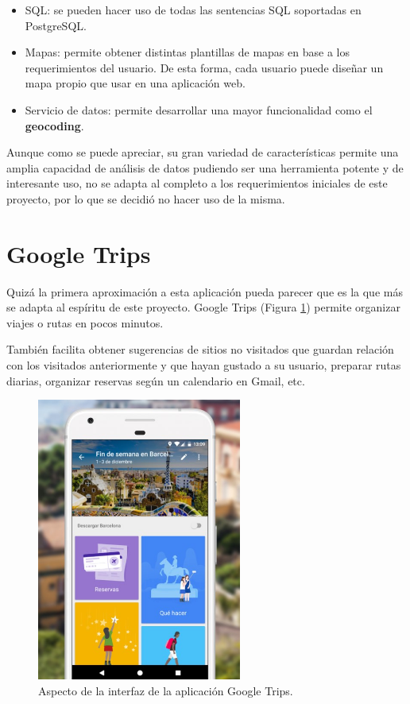 \begin{itemize}
	\item SQL: se pueden hacer uso de todas las sentencias SQL soportadas en PostgreSQL.
	\item Mapas: permite obtener distintas plantillas de mapas en base a los requerimientos del usuario. De esta forma, cada usuario puede diseñar un mapa propio que usar en una aplicación web.
	\item Servicio de datos: permite desarrollar una mayor funcionalidad como el \textbf{geocoding}.
\end{itemize}

Aunque como se puede apreciar, su gran variedad de características permite una amplia capacidad de análisis de datos pudiendo ser una herramienta potente y de interesante uso, no se adapta al completo a los requerimientos iniciales de este proyecto, por lo que se decidió no hacer uso de la misma.

\section{Google Trips}

Quizá la primera aproximación a esta aplicación pueda parecer que es la que más se adapta al espíritu de este proyecto. Google Trips \cite{trips:info} (Figura \ref{trips}) permite organizar viajes o rutas en pocos minutos.

También facilita obtener sugerencias de sitios no visitados que guardan relación con los visitados anteriormente y que hayan gustado a su usuario, preparar rutas diarias, organizar reservas según un calendario en Gmail, etc.

\begin{figure}[h]
  \centering
    \includegraphics[width=0.6\textwidth]{../img/weka/trips.jpg}
  \caption{Aspecto de la interfaz de la aplicación Google Trips.}
  \label{trips}
\end{figure}

